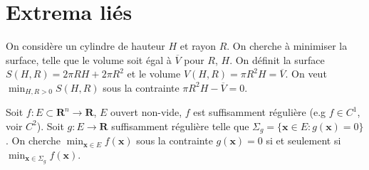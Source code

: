 \section{Extrema liés}
\begin{example}
On considère un cylindre de hauteur $H$ et rayon $R$. On cherche à minimiser la surface, telle que le volume soit égal à $\overline{V}$ pour $R$, $H$. On définit la surface $S(H,R)=2\pi RH+2\pi R^{2}$ et le volume $V(H,R)=\pi R^{2}H=\overline{V}$. On veut $\min_{H,R>0}S(H,R)$ sous la contrainte $\pi R^{2}H-\overline{V}=0$.
\end{example}

Soit $f:E\subset \mathbf{R}^{n}\to \mathbf{R}$, $E$ ouvert non-vide, $f$ est suffisamment régulière (e.g $f\in C^{1}$, voir $C^{2}$). Soit $g:E\to \mathbf{R}$ suffisamment régulière telle que $\Sigma _{g}=\{ \boldsymbol{x}\in E:g(\boldsymbol{x})=0 \}$. On cherche $\min_{\boldsymbol{x}\in E}f(\boldsymbol{x})$ sous la contrainte $g(\boldsymbol{x})=0$ si et seulement si $\min_{\boldsymbol{x}\in\Sigma _{g}}f(\boldsymbol{x})$.

